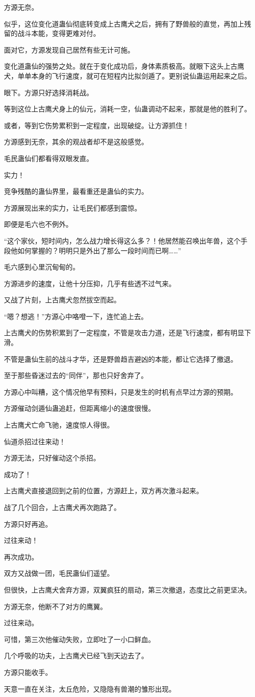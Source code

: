 \begin{this_body}
方源无奈。

似乎，这位变化道蛊仙彻底转变成上古鹰犬之后，拥有了野兽般的直觉，再加上残留的战斗本能，变得更难对付。

面对它，方源发现自己居然有些无计可施。

变化道蛊仙的强势之处。就在于变化成功后，身体素质极高。就眼下这头上古鹰犬，单单本身的飞行速度，就可在短程内比拟剑遁了。更别说仙蛊运用起来之后。

眼下。方源只好选择消耗战。

等到这位上古鹰犬身上的仙元，消耗一空，仙蛊调动不起来，那就是他的胜利了。

或者，等到它伤势累积到一定程度，出现破绽。让方源抓住！

方源感到无奈，其余的观战者却不是这般感觉。

毛民蛊仙们都看得双眼发直。

实力！

竞争残酷的蛊仙界里，最看重还是蛊仙的实力。

方源展现出来的实力，让毛民们都感到震惊。

即便是毛六也不例外。

“这个家伙，短时间内，怎么战力增长得这么多？！他居然能召唤出年兽，这个手段他如何掌握的？明明只是外出了那么一段时间而已啊……”

毛六感到心里沉甸甸的。

方源进步的速度，让他十分压抑，几乎有些透不过气来。

又战了片刻，上古鹰犬忽然拔空而起。

“嗯？想逃！”方源心中咯噔一下，连忙追上去。

上古鹰犬的伤势积累到了一定程度，不管是攻击力道，还是飞行速度，都有明显下滑。

不管是蛊仙生前的战斗才华，还是野兽趋吉避凶的本能，都让它选择了撤退。

至于那些昏迷过去的“同伴”，那也只好舍弃了。

方源心中叫糟，这个情况他早有预料，只是发生的时机有点早过方源的预期。

方源催动剑遁仙蛊追赶，但距离缩小的速度很慢。

上古鹰犬亡命飞驰，速度惊人得很。

仙道杀招过往来动！

方源无法，只好催动这个杀招。

成功了！

上古鹰犬直接退回到之前的位置，方源赶上，双方再次激斗起来。

战了几个回合，上古鹰犬再次跑路了。

方源只好再追。

过往来动！

再次成功。

双方又战做一团，毛民蛊仙们遥望。

但很快，上古鹰犬舍弃方源，双翼疯狂的扇动，第三次撤退，态度比之前更坚决。

方源无奈，他断不了对方的鹰翼。

过往来动。

可惜，第三次他催动失败，立即吐了一小口鲜血。

几个呼吸的功夫，上古鹰犬已经飞到天边去了。

方源只能收手。

天意一直在关注，太丘危险，又隐隐有兽潮的雏形出现。

\end{this_body}

